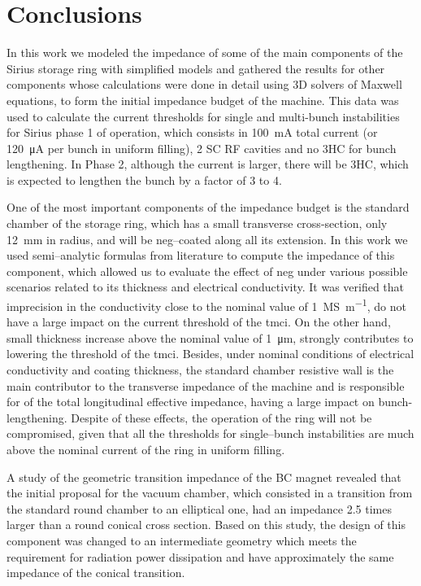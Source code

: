 %

\chapter*[Conclusions]{Conclusions}

    In this work we modeled the impedance of some of the main components of the Sirius storage ring with simplified models and gathered the results for other components whose calculations were done in detail using 3D solvers of Maxwell equations, to form the initial impedance budget of the machine. This data was used to calculate the current thresholds for single and multi-bunch instabilities for Sirius phase 1 of operation, which consists in \SI{100}{\milli\ampere} total current (or \SI{120}{\micro\ampere} per bunch in uniform filling), 2 SC RF cavities and no 3HC for bunch lengthening. In Phase 2, although the current is larger, there will be 3HC, which is expected to lengthen the bunch by a factor of 3 to 4.

    One of the most important components of the impedance budget is the standard chamber of the storage ring, which has a small transverse cross-section, only \SI{12}{\milli\meter} in radius, and will be \gls{neg}--coated along all its extension. In this work we used semi--analytic formulas from literature to compute the impedance of this component, which allowed us to evaluate the effect of \gls{neg} under various possible scenarios related to its thickness and electrical conductivity. It was verified that imprecision in the conductivity close to the nominal value of \SI{1}{\mega\siemens\per\meter}, do not have a large impact on the current threshold of the \gls{tmci}. On the other hand, small thickness increase above the nominal value of \SI{1}{\micro\meter}, strongly contributes to lowering the threshold of the \gls{tmci}. Besides, under nominal conditions of electrical conductivity and coating thickness, the standard chamber resistive wall is the main contributor to the transverse impedance of the machine and is responsible for  of the total longitudinal effective impedance, having a large impact on bunch-lengthening. Despite of these effects, the operation of the ring will not be compromised, given that all the thresholds for single--bunch instabilities are much above the nominal current of the ring in uniform filling.

    A study of the geometric transition impedance of the BC magnet revealed that the initial proposal for the vacuum chamber, which consisted in a transition from the standard round chamber to an elliptical one, had an impedance \num{2.5} times larger than a round conical cross section. Based on this study, the design of this component was changed to an intermediate geometry which meets the requirement for radiation power dissipation and have approximately the same impedance of the conical transition.

